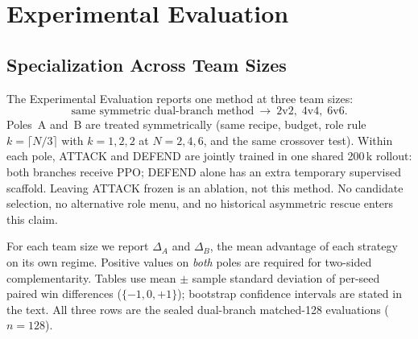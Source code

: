 
\section{Experimental Evaluation}
\label{sec:experiments}


\subsection{Specialization Across Team Sizes}

The Experimental Evaluation reports one method at three team sizes:
\[
\text{same symmetric dual-branch method}\ \rightarrow\ 2\mathrm{v}2,\;4\mathrm{v}4,\;6\mathrm{v}6.
\]
Poles~A and~B are treated symmetrically (same recipe, budget, role rule
\(k=\lceil N/3\rceil\) with \(k=1,2,2\) at \(N=2,4,6\), and the same
crossover test). Within each pole, ATTACK and DEFEND are jointly trained in
one shared 200\,k rollout: both branches receive PPO; DEFEND alone has an
extra temporary supervised scaffold. Leaving ATTACK frozen is an ablation,
not this method. No candidate selection, no alternative role menu, and no
historical asymmetric rescue enters this claim.

For each team size we report \(\Delta_A\) and \(\Delta_B\), the mean
advantage of each strategy on its own regime. Positive values on
\emph{both} poles are required for two-sided complementarity. Tables use
mean \(\pm\) sample standard deviation of per-seed paired win differences
(\(\{-1,0,+1\}\)); bootstrap confidence intervals are stated in the text.
All three rows are the sealed dual-branch matched-128 evaluations
(\(n=128\)).

